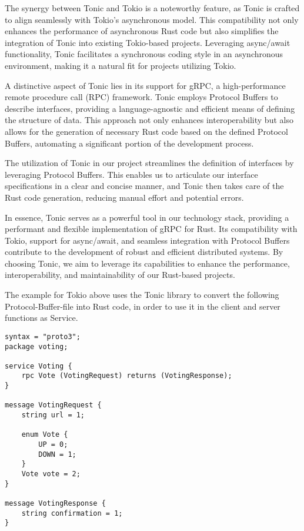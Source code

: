 The synergy between Tonic and Tokio is a noteworthy feature, as Tonic is crafted to align seamlessly with Tokio's asynchronous model. This compatibility not 
only enhances the performance of asynchronous Rust code but also simplifies the integration of Tonic into existing Tokio-based projects. Leveraging async/await 
functionality, Tonic facilitates a synchronous coding style in an asynchronous environment, making it a natural fit for projects utilizing Tokio.\newline

A distinctive aspect of Tonic lies in its support for gRPC, a high-performance remote procedure call (RPC) framework. Tonic employs Protocol Buffers to describe 
interfaces, providing a language-agnostic and efficient means of defining the structure of data. This approach not only enhances interoperability but also 
allows for the generation of necessary Rust code based on the defined Protocol Buffers, automating a significant portion of the development process.\newline

The utilization of Tonic in our project streamlines the definition of interfaces by leveraging Protocol Buffers. This enables us to articulate our interface 
specifications in a clear and concise manner, and Tonic then takes care of the Rust code generation, reducing manual effort and potential errors.\newline

In essence, Tonic serves as a powerful tool in our technology stack, providing a performant and flexible implementation of gRPC for Rust. Its compatibility with 
Tokio, support for async/await, and seamless integration with Protocol Buffers contribute to the development of robust and efficient distributed systems. By 
choosing Tonic, we aim to leverage its capabilities to enhance the performance, interoperability, and maintainability of our Rust-based projects.\newline

The example for Tokio above uses the Tonic library to convert the following Protocol-Buffer-file into Rust code, in order to use it in the client and server 
functions as Service.

\begin{verbatim}
syntax = "proto3";
package voting;
        
service Voting {
    rpc Vote (VotingRequest) returns (VotingResponse);
}
        
message VotingRequest {
    string url = 1;
        
    enum Vote {
        UP = 0;
        DOWN = 1;
    }
    Vote vote = 2;    
}
        
message VotingResponse {
    string confirmation = 1;
}
\end{verbatim}

